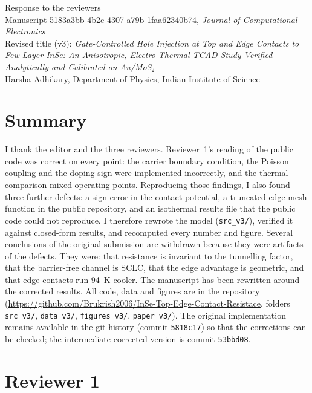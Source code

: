 \documentclass[11pt]{article}
\begin{document}
\begin{center}
{\Large Response to the reviewers}\\[4pt]
Manuscript 5183a3bb-4b2c-4307-a79b-1faa62340b74, \textit{Journal of Computational Electronics}\\
Revised title (v3): \textit{Gate-Controlled Hole Injection at Top and Edge Contacts to Few-Layer InSe: An Anisotropic, Electro-Thermal TCAD Study Verified Analytically and Calibrated on Au/MoS$_2$}\\
Harsha Adhikary, Department of Physics, Indian Institute of Science
\end{center}

\section*{Summary}
I thank the editor and the three reviewers. Reviewer~1's reading of the public code was correct on every point: the carrier boundary condition, the Poisson coupling and the doping sign were implemented incorrectly, and the thermal comparison mixed operating points. Reproducing those findings, I also found three further defects: a sign error in the contact potential, a truncated edge-mesh function in the public repository, and an isothermal results file that the public code could not reproduce. I therefore rewrote the model (\texttt{src\_v3/}), verified it against closed-form results, and recomputed every number and figure. Several conclusions of the original submission are withdrawn because they were artifacts of the defects. They were: that resistance is invariant to the tunnelling factor, that the barrier-free channel is SCLC, that the edge advantage is geometric, and that edge contacts run 94~K cooler. The manuscript has been rewritten around the corrected results. All code, data and figures are in the repository (\url{https://github.com/Brukrish2006/InSe-Top-Edge-Contact-Resistace}, folders \texttt{src\_v3/}, \texttt{data\_v3/}, \texttt{figures\_v3/}, \texttt{paper\_v3/}). The original implementation remains available in the git history (commit \texttt{5818c17}) so that the corrections can be checked; the intermediate corrected version is commit \texttt{53bbd08}.

\section*{Reviewer 1}
\end{document}
